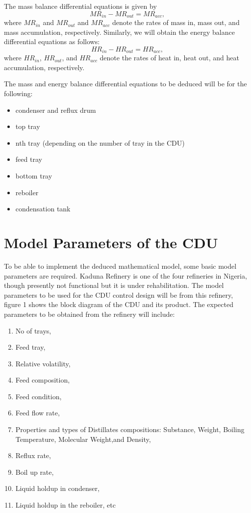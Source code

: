 \documentclass[11pt,a4paper,oneside]{article}
\begin{document}
The mass balance differential equations is given by
\begin{equation}
  \label{eq:mass_balance}
MR_{in} - MR_{out} = MR_{acc} ,
\end{equation}
where $MR_{in}$ and $MR_{out}$ and $MR_{acc}$ denote the rates of mass in, mass out, and mass accumulation, respectively.
Similarly, we will obtain the energy balance differential equations as follows:
\begin{equation}
  \label{eq:energy_balance}
HR_{in} - HR_{out} = HR_{acc} ,
\end{equation}
where $HR_{in}$, $HR_{out}$, and $HR_{acc}$ denote the rates of heat in, heat out, and heat accumulation, respectively.

The mass and energy balance differential equations to be deduced will be for the following:
\begin{itemize}
    \item condenser and reflux drum
    \item top tray
    \item nth tray (depending on the number of tray in the CDU)
    \item feed tray
    \item bottom tray
    \item reboiler
    \item condensation tank
\end{itemize}

\section{Model Parameters of the CDU}
To be able to implement the deduced mathematical model, some basic model parameters are required. Kaduna Refinery is one of the four refineries in Nigeria, though presently not functional but it is under rehabilitation. The model parameters to be used for the CDU control design will be from this refinery, figure 1 shows the block diagram of the CDU and its product. The expected parameters to be obtained from the refinery will include:
\begin{enumerate}
  \item No of trays,
  \item Feed tray,
  \item Relative volatility,
  \item Feed composition,
  \item Feed condition,
  \item Feed flow rate,
  \item Properties and types of Distillates compositions: Substance, Weight, Boiling Temperature, Molecular
Weight,and Density,
    \item Reflux rate,
    \item Boil up rate,
    \item Liquid holdup in condenser,
    \item Liquid holdup in the reboiler, etc
\end{enumerate}
\end{document}

